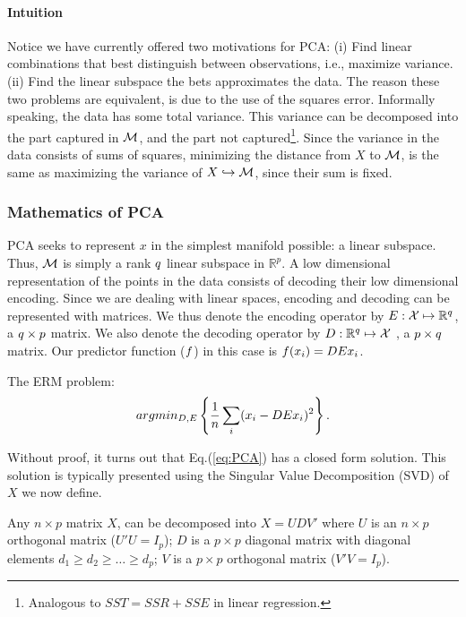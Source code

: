 \paragraph{Intuition}
Notice we have currently offered two motivations for PCA: 
(i) Find linear combinations that best distinguish between observations, i.e., maximize variance. 
(ii) Find the linear subspace the bets approximates the data.
The reason these two problems are equivalent, is due to the use of the squares error.
Informally speaking, the data has some total variance. This variance can be decomposed into the part captured in $\mathcal{M}$, and the part not captured\footnote{Analogous to $SST=SSR+SSE$ in linear regression.}. 
Since the variance in the data consists of sums of squares, minimizing the distance from $X$ to $\mathcal{M}$, is the same as maximizing the variance of $X \hookrightarrow \mathcal{M}$, since their sum is fixed.


\subsubsection{Mathematics of PCA}

PCA seeks to represent $x$ in the simplest manifold possible: a linear subspace. Thus, $\mathcal{M}$ is simply a rank $q$ linear subspace in $\mathbb{R}^p$.
A low dimensional representation of the points in the data consists of decoding their low dimensional encoding. 
Since we are dealing with linear spaces, encoding and decoding can be represented with matrices. 
We thus denote the encoding operator by $E:\mathcal{X} \mapsto \mathbb{R}^q$, a $q \times p$ matrix.
We also denote the decoding operator by $D:\mathbb{R}^q \mapsto \mathcal{X}$ , a $p \times q$ matrix. 
Our predictor function ($f$) in this case is $f(x_i)=DE x_i$.
 
The ERM problem:
\begin{align}
\label{eq:PCA}
	argmin_{D,E}\left\{ \frac{1}{n}\sum_i (x_i-DE x_i)^2 \right\} .
\end{align}

Without proof, it turns out that Eq.(\ref{eq:PCA}) has a closed form solution. 
This solution is typically presented using the Singular Value Decomposition (SVD) of $X$ we now define.
\begin{definition}[SVD]
Any $n \times p$ matrix $X$, can be decomposed into $X=UDV'$ where 
$U$ is an $n \times p$ orthogonal matrix ($U'U=I_p$); 
$D$ is a $p \times p$ diagonal matrix with diagonal elements $d_1 \geq d_2 \geq \dots \geq d_p$;
$V$ is a $p \times p$ orthogonal matrix ($V'V=I_p$).
\end{definition}

